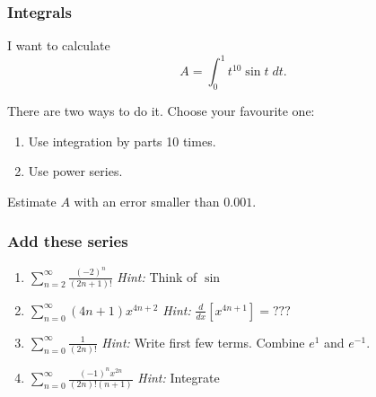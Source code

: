\documentclass[14pt]{beamer}
\newcommand {\DS} [1] {${\displaystyle #1}$}
\newcommand{\p}{\pause}
\newcommand{\setsize}[1]{\fontsize{#1}{#1}\selectfont} %
\newcommand{\smallerfont}{\setsize{13}} %
\newcommand{\vv}{\vspace{.5cm}}
\begin{document}
\begin{frame}[t]
\frametitle{Integrals}

I want to calculate
	$$
		A = \int_0^1 t^{10}\sin t \; dt.
	$$

There are two ways to do it.  Choose your favourite one:
	\begin{enumerate}
		\item Use integration by parts 10 times.
		\item Use power series. 
	\end{enumerate}
\p
\hrulefill
\vv	

Estimate $A$ with an error smaller than $0.001$.
		
\end{frame}
\begin{frame}[t]
\smallerfont
\frametitle{Add these series}

\begin{enumerate}
	\item \DS{\sum_{n=2}^{\infty} \frac{(-2)^n}{(2n+1)!}}
		\hfill
	\emph{Hint:} Think of $\sin$

\vfill
	\item \DS{\sum_{n=0}^{\infty} (4n+1) {x^{4n+2}}}
		\hfill
	\emph{Hint:}   \DS{\frac{d}{dx} \left[ x^{4n+1} \right] = ???}

\vfill
	\item \DS{\sum_{n=0}^{\infty} \frac{1}{(2n)!}}
		\hfill
	\emph{Hint:} Write first few terms.  Combine \DS{e^1} and \DS{e^{-1}}.

\vfill
	\item \DS{\sum_{n=0}^{\infty} \frac{(-1)^n x^{2n}}{(2n)!(n+1)}}
		\hfill
	\emph{Hint:} Integrate %
	
\vfill
\end{enumerate}

\end{frame}
\end{document}
